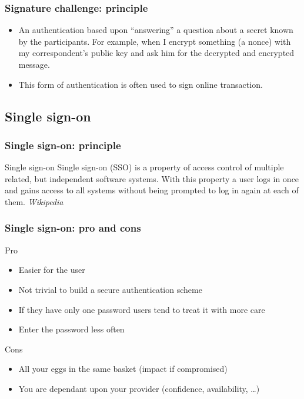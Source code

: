 \begin{frame}
\frametitle{Signature challenge: principle}

\begin{itemize}
\item An authentication based upon ``answering'' a question about a secret
known by the participants. For example, when I encrypt something (a nonce)
with my correspondent's public key and ask him for the decrypted and encrypted
message.

\item This form of authentication is often used to sign online
  transaction.
\end{itemize}

\end{frame}

\subsection{Single sign-on}

\begin{frame}
\frametitle{Single sign-on: principle}

\begin{block}{Single sign-on}
Single sign-on (SSO) is a property of access control of multiple
related, but independent software systems. With this property a user
logs in once and gains access to all systems without being prompted to
log in again at each of them. \textit{Wikipedia}
\end{block}

\end{frame}

\begin{frame}
\frametitle{Single sign-on: pro and cons}

\begin{block}{Pro}
\begin{itemize}
\item Easier for the user
\item Not trivial to build a secure authentication scheme
\item If they have only one password users tend to treat it with more care
\item Enter the password less often
\end{itemize}
\end{block}

\begin{block}{Cons}
\begin{itemize}
\item All your eggs in the same basket (impact if compromised)
\item You are dependant upon your provider (confidence, availability, \ldots)
\end{itemize}
\end{block}

\end{frame}

